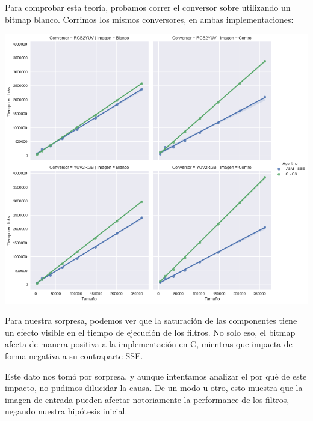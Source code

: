 Para comprobar esta teoría, probamos correr el conversor sobre utilizando un bitmap blanco. Corrimos los mismos conversores, en ambas implementaciones:

\begin{center}
	\includegraphics[scale=0.5]{img/conversores_blanco.png}
\end{center}

Para nuestra sorpresa, podemos ver que la saturación de las componentes tiene un efecto visible en el tiempo de ejecución de los filtros. No solo eso, el bitmap afecta de manera positiva a la implementación en C, mientras que impacta de forma negativa a su contraparte SSE.

Este dato nos tomó por sorpresa, y aunque intentamos analizar el por qué de este impacto, no pudimos dilucidar la causa. De un modo u otro, esto muestra que la imagen de entrada pueden afectar notoriamente la performance de los filtros, negando nuestra hipótesis inicial.